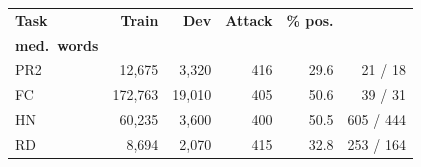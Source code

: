 \footnotesize
\setlength{\tabcolsep}{3pt}
\renewcommand{\arraystretch}{1.05}
\begin{tabular}{lrrrrr}
\toprule
\textbf{Task} & \textbf{Train} & \textbf{Dev} & \textbf{Attack} & \textbf{\% pos.} & \shortstack{\textbf{Mean /}\\\textbf{med.\ words}} \\
\midrule
PR2 & 12{,}675  & 3{,}320  & 416 & 29.6 & 21 / 18 \\
FC  & 172{,}763 & 19{,}010 & 405 & 50.6 & 39 / 31 \\
HN  & 60{,}235  & 3{,}600  & 400 & 50.5 & 605 / 444 \\
RD  & 8{,}694   & 2{,}070  & 415 & 32.8 & 253 / 164 \\
\bottomrule
\end{tabular}
